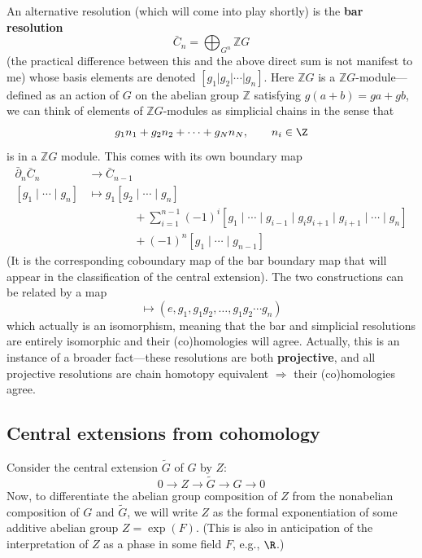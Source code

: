 \documentclass{report}
\begin{document}
 An alternative resolution (which will come into play shortly) is the \textbf{bar
resolution} 
\begin{equation*}
	\bar{C}_n = \bigoplus_{G^n} \mathbb{Z}G
\end{equation*}
(the practical difference between this and the above direct sum is not manifest to me) 
whose basis elements are denoted $ [g_1\vert g_2 \vert \cdots \vert g_n] $.
Here $ \mathbb{Z}G $ is a $ \mathbb{Z}G $-module---defined as an action of $ G $ 
on the abelian group $ \mathbb{Z} $ satisfying $ g(a + b) = ga + gb $, we can
think of elements of $ \mathbb{Z}G $-modules as simplicial chains in the sense
that 
\begin{equation*}
	g_1 n_1 + g_2 n_2 + \cdots + g_N n_N , \qquad n_i\in \Z
\end{equation*}
is in a $ \mathbb{Z}G $ module. This comes with its own boundary map 
\begin{align*}
	\bar{\partial}_n \bar{C}_n &\longrightarrow \bar{C}_{n-1} \\ 
	[g_1 \mid \cdots \mid g_n] &\longmapsto
	g_1 [g_2 \mid \cdots \mid g_n]\\
		&\qquad \qquad + \sum_{i = 1}^{n-1}(-1)^i [g_1\mid\cdots\mid g_{i-1} \mid g_i g_{i+1}\mid 
		g_{i+1} \mid \cdots \mid g_{n}]\\
		&\qquad \qquad + (-1)^n [g_1 \mid \cdots \mid g_{n-1}]
\end{align*}
 (It is the corresponding coboundary map of
the bar boundary map that will appear in the classification of the central
extension). The two constructions can be related by a map 
\begin{equation*}
	[g_1 \mid \cdots \mid g_n] \mapsto 
	(e, g_1, g_1 g_2, \dots , g_1 g_2 \cdots g_n)
\end{equation*}
which actually is an isomorphism, meaning that the bar and simplicial resolutions 
are entirely isomorphic and their (co)homologies will agree. Actually, this is 
an instance of a broader fact---these resolutions are both \textbf{projective},
and all projective resolutions are chain homotopy equivalent $ \Longrightarrow  $
their (co)homologies agree.

\subsection{Central extensions from cohomology}
Consider the central extension $ \tilde{G} $ of $ G $ by $ Z $:
\begin{equation*}
	0 \longrightarrow 
	Z
	\longrightarrow
	\tilde{G}
	\longrightarrow
	G
	\longrightarrow 
	0
\end{equation*}
Now, to differentiate the abelian group composition of $ Z $ from the 
nonabelian composition of $ G $ and $ \tilde{G} $, we will write $ Z $ as the 
formal exponentiation of some additive abelian group $ Z = \exp(F) $. (This is
also in anticipation of the interpretation of $ Z $ as a phase in some field 
$ F $, e.g., $\R$.) 
\end{document}
